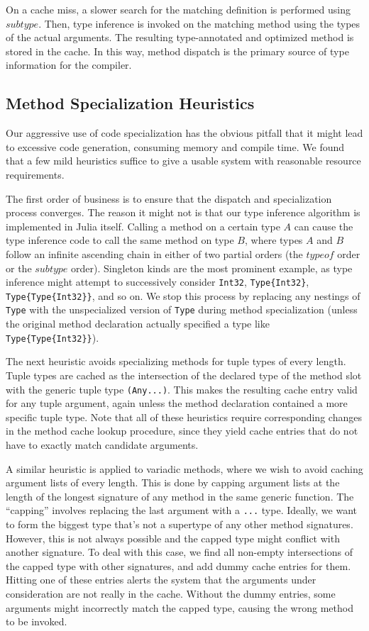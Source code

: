\documentclass[9pt]{sigplanconf}
\begin{document}
On a cache miss, a slower search for the matching definition is performed using
$subtype$.
Then, type inference is invoked on the matching method using the types
of the actual arguments. The resulting type-annotated and optimized method is
stored in the cache. In this way, method dispatch is the primary source of type
information for the compiler.

\subsection{Method Specialization Heuristics}

Our aggressive use of code specialization has the obvious pitfall that it might
lead to excessive code generation, consuming memory and compile time. We found
that a few mild heuristics suffice to give a usable system with reasonable
resource requirements.

The first order of business is to ensure that the dispatch and specialization
process converges. The reason it might not is that our type inference algorithm
is implemented in Julia itself. Calling a method on a certain type $A$ can cause
the type inference code to call the same method on type $B$, where types
$A$ and $B$
follow an infinite ascending chain in either of two partial orders (the
$typeof$ order or the $subtype$ order). Singleton kinds are the most
prominent example, as type inference might attempt to successively consider
{\tt Int32}, {\tt Type\{Int32\}}, {\tt Type\{Type\{Int32\}\}}, and so on. We
stop this process by replacing any nestings of {\tt Type} with the
unspecialized version of {\tt Type} during method specialization (unless the
original method declaration actually specified a type like
{\tt Type\{Type\{Int32\}\}}).

The next heuristic avoids specializing methods for tuple types of every length.
Tuple types are cached as the intersection of the declared type of the method
slot with the generic tuple type {\tt (Any...)}. This makes the resulting cache
entry valid for any tuple argument, again unless the method declaration
contained a more specific tuple type. Note that all of these heuristics require
corresponding changes in the method cache lookup procedure, since they yield
cache entries that do not have to exactly match candidate arguments.

A similar heuristic is applied to variadic methods, where we wish to avoid
caching argument lists of every length. This is done by capping argument lists
at the length of the longest signature of any method in the same generic
function. The ``capping'' involves replacing the last argument with a
{\tt ...} type. Ideally, we want to form the biggest type that's not a
supertype of any other method signatures. However, this is not always possible
and the capped type might conflict with another signature. To deal with this
case, we find all non-empty intersections of the capped type with other
signatures, and add dummy cache entries for them. Hitting one of these entries
alerts the system that the arguments under consideration are not really in the
cache. Without the dummy entries, some arguments might incorrectly match the
capped type, causing the wrong method to be invoked.
\end{document}
